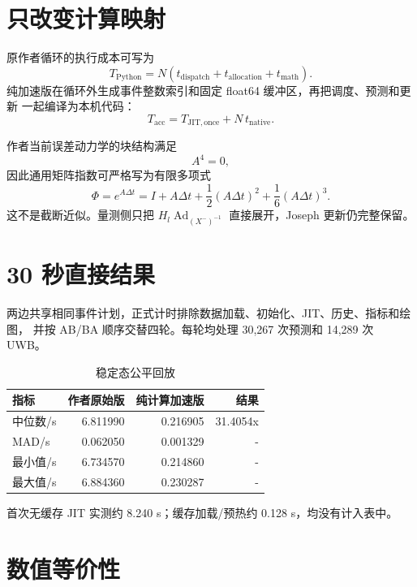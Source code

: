 \documentclass[11pt,a4paper]{ctexart}
\begin{document}
\section{只改变计算映射}

原作者循环的执行成本可写为
\begin{equation}
 T_{\mathrm{Python}}
 =N(t_{\mathrm{dispatch}}+t_{\mathrm{allocation}}+t_{\mathrm{math}}).
\end{equation}
纯加速版在循环外生成事件整数索引和固定 float64 缓冲区，再把调度、预测和更新
一起编译为本机代码：
\begin{equation}
 T_{\mathrm{acc}}
 =T_{\mathrm{JIT,once}}+N\,t_{\mathrm{native}}.
\end{equation}

作者当前误差动力学的块结构满足
\begin{equation}
 A^4=0,
\end{equation}
因此通用矩阵指数可严格写为有限多项式
\begin{equation}
\boxed{
\Phi=e^{A\Delta t}
=I+A\Delta t+\frac12(A\Delta t)^2+\frac16(A\Delta t)^3
}.
\end{equation}
这不是截断近似。量测侧只把
$H_l\operatorname{Ad}_{(X^-)^{-1}}$ 直接展开，Joseph 更新仍完整保留。

\section{30 秒直接结果}

两边共享相同事件计划，正式计时排除数据加载、初始化、JIT、历史、指标和绘图，
并按 AB/BA 顺序交替四轮。每轮均处理 30,267 次预测和 14,289 次 UWB。

\begin{table}[H]
\centering
\caption{稳定态公平回放}
\begin{tabular}{lrrr}
\toprule
指标 & 作者原始版 & 纯计算加速版 & 结果\\
\midrule
中位数/s & 6.811990 & 0.216905 & 31.4054x\\
MAD/s & 0.062050 & 0.001329 & -\\
最小值/s & 6.734570 & 0.214860 & -\\
最大值/s & 6.884360 & 0.230287 & -\\
\bottomrule
\end{tabular}
\end{table}

首次无缓存 JIT 实测约 8.240 s；缓存加载/预热约 0.128 s，均没有计入表中。

\section{数值等价性}
\end{document}
